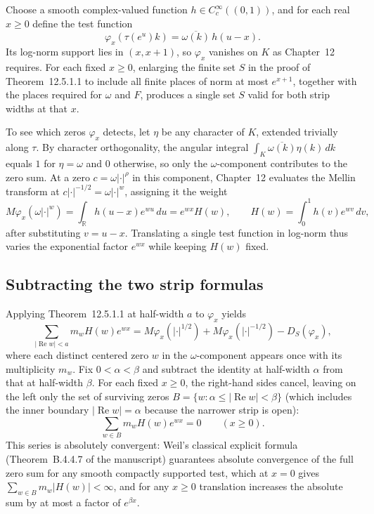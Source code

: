 \documentclass[11pt,letterpaper]{article}
\newcommand{\R}{\mathbb{R}}
\newcommand{\dd}{\,d}
\DeclareMathOperator{\RePt}{Re}
\begin{document}
Choose a smooth complex-valued function $h\in C_c^\infty((0,1))$, and for each real $x\ge 0$ define the test function
\[
  \varphi_x(\tau(e^u)k) = \overline{\omega(k)}\,h(u-x).
\]
Its log-norm support lies in $(x, x+1)$, so $\varphi_x$ vanishes on $K$ as Chapter~12 requires. For each fixed $x\ge 0$, enlarging the finite set $S$ in the proof of Theorem~12.5.1.1 to include all finite places of norm at most $e^{x+1}$, together with the places required for $\omega$ and $F$, produces a single set $S$ valid for both strip widths at that $x$.

To see which zeros $\varphi_x$ detects, let $\eta$ be any character of $K$, extended trivially along $\tau$. By character orthogonality, the angular integral $\int_K \overline{\omega(k)}\eta(k)\dd k$ equals $1$ for $\eta = \omega$ and $0$ otherwise, so only the $\omega$-component contributes to the zero sum. At a zero $c = \omega|\cdot|^\rho$ in this component, Chapter~12 evaluates the Mellin transform at $c|\cdot|^{-1/2} = \omega|\cdot|^w$, assigning it the weight
\[
  M\varphi_x(\omega|\cdot|^w)
   = \int_{\R} h(u-x)e^{wu}\dd u
   = e^{wx}H(w), \qquad H(w) = \int_0^1 h(v)e^{wv}\dd v,
\]
after substituting $v = u-x$. Translating a single test function in log-norm thus varies the exponential factor $e^{wx}$ while keeping $H(w)$ fixed.

\subsection*{Subtracting the two strip formulas}

Applying Theorem~12.5.1.1 at half-width $a$ to $\varphi_x$ yields
\[
  \sum_{|\RePt w|<a} m_w H(w)e^{wx}
   = M\varphi_x(|\cdot|^{1/2}) + M\varphi_x(|\cdot|^{-1/2}) - D_S(\varphi_x),
\]
where each distinct centered zero $w$ in the $\omega$-component appears once with its multiplicity $m_w$. Fix $0 < \alpha < \beta$ and subtract the identity at half-width $\alpha$ from that at half-width $\beta$. For each fixed $x\ge 0$, the right-hand sides cancel, leaving on the left only the set of surviving zeros $B = \{w : \alpha \le |\RePt w| < \beta\}$ (which includes the inner boundary $|\RePt w| = \alpha$ because the narrower strip is open):
\begin{equation}
  \sum_{w\in B} m_w H(w)e^{wx} = 0 \qquad (x \ge 0).
  \label{eq:band-translates}
\end{equation}
This series is absolutely convergent: Weil's classical explicit formula (Theorem~B.4.4.7 of the manuscript) guarantees absolute convergence of the full zero sum for any smooth compactly supported test, which at $x=0$ gives $\sum_{w\in B} m_w|H(w)| < \infty$, and for any $x\ge 0$ translation increases the absolute sum by at most a factor of $e^{\beta x}$.
\end{document}
